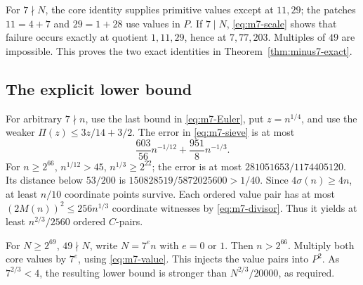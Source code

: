 For \(7\nmid N\), the core identity supplies primitive values
except at \(11,29\); the patches \(11=4+7\) and \(29=1+28\)
use values in \(P\). If \(7\mid N\), \eqref{eq:m7-scale}
shows that failure occurs exactly at quotient \(1,11,29\),
hence at \(7,77,203\). Multiples of \(49\) are impossible.
This proves the two exact identities in Theorem~\ref{thm:minus7-exact}.

\subsection{The explicit lower bound}

For arbitrary \(7\nmid n\), use the last bound in
\eqref{eq:m7-Euler}, put \(z=n^{1/4}\), and use the weaker
\(\Pi(z)\le3z/14+3/2\). The error in \eqref{eq:m7-sieve} is at most
\[
                         \frac{603}{56}n^{-1/12}
                                  +\frac{951}{8}n^{-1/3}.
\]
For \(n\ge2^{66}\), \(n^{1/12}>45\), \(n^{1/3}\ge2^{22}\);
the error is at most \(281051653/1174405120\).
Its distance below \(53/200\) is
\(150828519/5872025600>1/40\).
Since \(4\sigma(n)\ge4n\), at least \(n/10\) coordinate points
survive. Each ordered value pair has at most
\((2M(n))^2\le256n^{1/3}\) coordinate witnesses by
\eqref{eq:m7-divisor}. Thus it yields at least
\(n^{2/3}/2560\) ordered \(C\)-pairs.

For \(N\ge2^{69}\), \(49\nmid N\), write \(N=7^en\) with
\(e=0\) or \(1\). Then \(n>2^{66}\).
Multiply both core values by \(7^e\), using \eqref{eq:m7-value}.
This injects the value pairs into \(P^2\).
As \(7^{2/3}<4\), the resulting lower bound is stronger than
\(N^{2/3}/20000\), as required.
